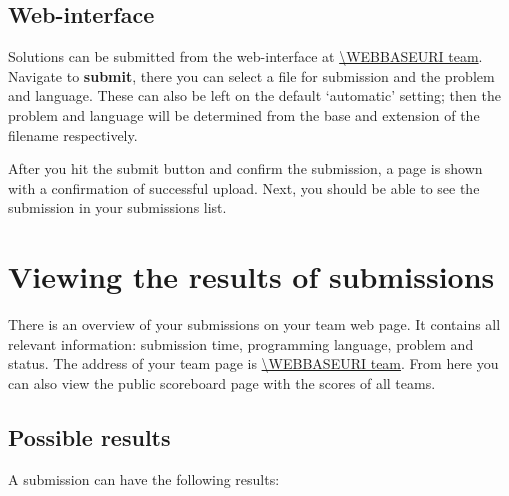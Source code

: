\subsection{Web-interface}

Solutions can be submitted from the web-interface at \url{\WEBBASEURI team}.
Navigate to \textbf{submit}, there you can select a file for
submission and the problem and language. These can also be left on the
default `automatic' setting; then the problem and language will be
determined from the base and extension of the filename respectively.

After you hit the submit button and confirm the submission, a page is
shown with a confirmation of successful upload. Next, you should be
able to see the submission in your submissions list.

\section{Viewing the results of submissions}

There is an overview of your submissions on your team web page.
It contains all relevant information: submission time, programming
language, problem and status. The address of your team page is
\url{\WEBBASEURI team}. From here you can also view the public
scoreboard page with the scores of all teams.

\subsection{Possible results}

A submission can have the following results:

